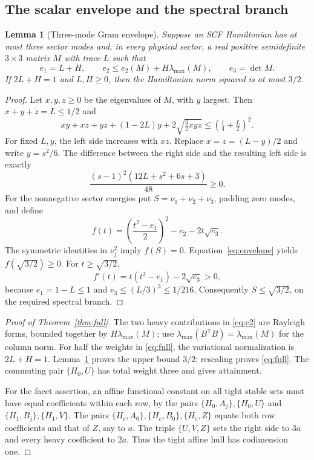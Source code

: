 \documentclass[11pt,a4paper]{article}
\newtheorem{lemma}[theorem]{Lemma}
\theoremstyle{remark}\newtheorem{remark}[theorem]{Remark}
\begin{document}
\subsection{The scalar envelope and the spectral branch}
\begin{lemma}[Three-mode Gram envelope]\label{lem:envelope}
Suppose an SCF Hamiltonian has at most three sector modes and, in every
physical sector, a real positive semidefinite $3\times3$ matrix $M$ with
trace $L$ such that
\[
 e_1=L+H,\qquad e_2\leq e_2(M)+H\lambda_{\max}(M),
 \qquad e_3=\det M.
\]
If $2L+H=1$ and $L,H\geq0$, then the Hamiltonian norm squared is at
most $3/2$.
\end{lemma}
\begin{proof}
Let $x,y,z\geq0$ be the eigenvalues of $M$, with $y$ largest. Then
$x+y+z=L\leq1/2$ and
\begin{equation}\label{eq:envelope}
 xy+xz+yz+(1-2L)y+2\sqrt{\tfrac32 xyz}
 \leq (\tfrac14+\tfrac L2)^2.
\end{equation}
For fixed $L,y$, the left side increases with $xz$. Replace $x=z=(L-y)/2$
and write $y=s^2/6$. The difference between the right side and the
resulting left side is exactly
\[
 \frac{(s-1)^2(12L+s^2+6s+3)}{48}\geq0.
\]
For the nonnegative sector energies put $S=\nu_1+\nu_2+\nu_3$, padding
zero modes, and define
\[
 f(t)=\left(\frac{t^2-e_1}{2}\right)^2-e_2-2t\sqrt{e_3}.
\]
The symmetric identities in $\nu_j^2$ imply $f(S)=0$.
Equation~\eqref{eq:envelope} yields $f(\sqrt{3/2})\geq0$.
For $t\geq\sqrt{3/2}$,
\[
 f'(t)=t(t^2-e_1)-2\sqrt{e_3}>0,
\]
because $e_1=1-L\leq1$ and $e_3\leq(L/3)^3\leq1/216$.
Consequently $S\leq\sqrt{3/2}$, on the required spectral branch.
\end{proof}

\begin{proof}[Proof of Theorem~\ref{thm:full}]
The two heavy contributions in \eqref{eq:e2} are Rayleigh forms,
bounded together by $H\lambda_{\max}(M)$; use
$\lambda_{\max}(B^{\mathsf T}B)=\lambda_{\max}(M)$ for the column norm.
For half the weights in \eqref{eq:full}, the variational normalization
is $2L+H=1$. Lemma~\ref{lem:envelope} proves the upper bound $3/2$;
rescaling proves \eqref{eq:full}. The commuting pair $\{H_0,U\}$
has total weight three and gives attainment.

For the facet assertion, an affine functional constant on all tight
stable sets must have equal coefficients within each row, by the pairs
$\{H_0,A_j\},\{H_0,U\}$ and $\{H_1,B_j\},\{H_1,V\}$.
The pairs $\{H_c,A_0\},\{H_c,B_0\},\{H_c,Z\}$ equate both row
coefficients and that of $Z$, say to $a$. The triple $\{U,V,Z\}$
sets the right side to $3a$ and every heavy coefficient to $2a$.
Thus the tight affine hull has codimension one.
\end{proof}
\end{document}

